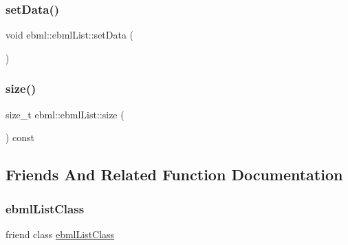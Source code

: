 \mbox{\label{classebml_1_1ebmlList_a4fe5b352155dd7180522e85ec7d7f865}} 
\subsubsection{\texorpdfstring{set\+Data()}{setData()}\hspace{0.1cm}{\footnotesize\ttfamily [2/2]}}
{\footnotesize\ttfamily void ebml\+::ebml\+List\+::set\+Data (\begin{DoxyParamCaption}\item[{\mbox{\hyperlink{namespaceebml_a1ddadd26791f273d851882653b9caf70}{ebml\+Element\+\_\+l}} \&\&}]{ }\end{DoxyParamCaption})}

\mbox{\label{classebml_1_1ebmlList_a9537fed381f80c9d06fdd2ccb08a42b2}} 
\subsubsection{\texorpdfstring{size()}{size()}}
{\footnotesize\ttfamily size\+\_\+t ebml\+::ebml\+List\+::size (\begin{DoxyParamCaption}{ }\end{DoxyParamCaption}) const}



\subsection{Friends And Related Function Documentation}
\mbox{\label{classebml_1_1ebmlList_a97c631dff45f04b8ed9b303d6a9e03c5}} 
\subsubsection{\texorpdfstring{ebml\+List\+Class}{ebmlListClass}}
{\footnotesize\ttfamily friend class \mbox{\hyperlink{classebml_1_1ebmlListClass}{ebml\+List\+Class}}\hspace{0.3cm}{\ttfamily [friend]}}


